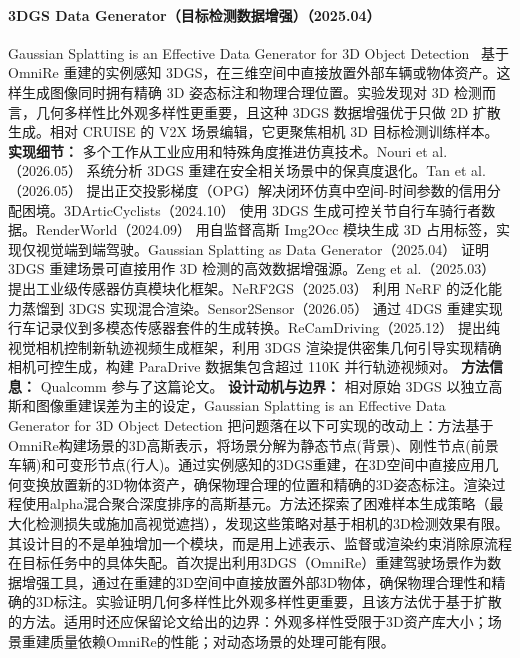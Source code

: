 \paragraph{3DGS Data Generator（目标检测数据增强）（2025.04）}
Gaussian Splatting is an Effective Data Generator for 3D Object Detection~\cite{2504_16740} 基于 OmniRe 重建的实例感知 3DGS，在三维空间中直接放置外部车辆或物体资产。这样生成图像同时拥有精确 3D 姿态标注和物理合理位置。实验发现对 3D 检测而言，几何多样性比外观多样性更重要，且这种 3DGS 数据增强优于只做 2D 扩散生成。相对 CRUISE 的 V2X 场景编辑，它更聚焦相机 3D 目标检测训练样本。
\textbf{实现细节：} 多个工作从工业应用和特殊角度推进仿真技术。Nouri et al.（2026.05） 系统分析 3DGS 重建在安全相关场景中的保真度退化。Tan et al.（2026.05） 提出正交投影梯度（OPG）解决闭环仿真中空间-时间参数的信用分配困境。3DArticCyclists（2024.10） 使用 3DGS 生成可控关节自行车骑行者数据。RenderWorld（2024.09） 用自监督高斯 Img2Occ 模块生成 3D 占用标签，实现仅视觉端到端驾驶。Gaussian Splatting as Data Generator（2025.04） 证明 3DGS 重建场景可直接用作 3D 检测的高效数据增强源。Zeng et al.（2025.03） 提出工业级传感器仿真模块化框架。NeRF2GS（2025.03） 利用 NeRF 的泛化能力蒸馏到 3DGS 实现混合渲染。Sensor2Sensor（2026.05） 通过 4DGS 重建实现行车记录仪到多模态传感器套件的生成转换。ReCamDriving（2025.12） 提出纯视觉相机控制新轨迹视频生成框架，利用 3DGS 渲染提供密集几何引导实现精确相机可控生成，构建 ParaDrive 数据集包含超过 110K 并行轨迹视频对。
\textbf{方法信息：} Qualcomm 参与了这篇论文。
\textbf{设计动机与边界：} 相对原始 3DGS 以独立高斯和图像重建误差为主的设定，Gaussian Splatting is an Effective Data Generator for 3D Object Detection 把问题落在以下可实现的改动上：方法基于OmniRe构建场景的3D高斯表示，将场景分解为静态节点(背景)、刚性节点(前景车辆)和可变形节点(行人)。通过实例感知的3DGS重建，在3D空间中直接应用几何变换放置新的3D物体资产，确保物理合理的位置和精确的3D姿态标注。渲染过程使用alpha混合聚合深度排序的高斯基元。方法还探索了困难样本生成策略（最大化检测损失或施加高视觉遮挡），发现这些策略对基于相机的3D检测效果有限。其设计目的不是单独增加一个模块，而是用上述表示、监督或渲染约束消除原流程在目标任务中的具体失配。首次提出利用3DGS（OmniRe）重建驾驶场景作为数据增强工具，通过在重建的3D空间中直接放置外部3D物体，确保物理合理性和精确的3D标注。实验证明几何多样性比外观多样性更重要，且该方法优于基于扩散的方法。适用时还应保留论文给出的边界：外观多样性受限于3D资产库大小；场景重建质量依赖OmniRe的性能；对动态场景的处理可能有限。
